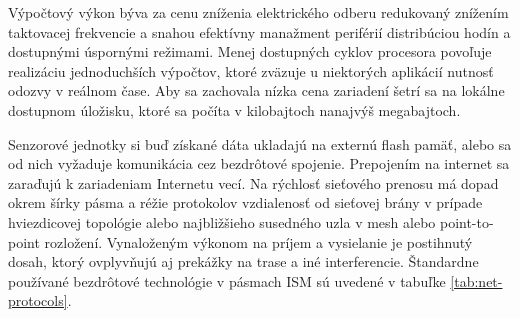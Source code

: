 Výpočtový výkon býva za cenu zníženia elektrického odberu redukovaný
znížením taktovacej frekvencie a snahou efektívny manažment periférií distribúciou hodín a dostupnými
úspornými režimami. Menej dostupných cyklov procesora povoľuje realizáciu jednoduchších výpočtov, ktoré zväzuje
u niektorých aplikácií nutnosť odozvy v reálnom čase. Aby sa zachovala nízka cena zariadení šetrí sa
na lokálne dostupnom úložisku, ktoré sa počíta v kilobajtoch nanajvýš megabajtoch.

Senzorové jednotky si buď získané dáta ukladajú na externú flash pamäť, alebo sa od nich vyžaduje komunikácia
cez bezdrôtové spojenie. Prepojením na internet sa zaraďujú k zariadeniam Internetu vecí.
Na rýchlosť sieťového prenosu má dopad okrem šírky pásma a réžie protokolov
vzdialenosť od sieťovej brány v prípade hviezdicovej topológie alebo najbližšieho susedného uzla v mesh
alebo point-to-point rozložení. Vynaloženým výkonom na príjem a vysielanie je postihnutý dosah, ktorý
ovplyvňujú aj prekážky na trase a iné interferencie. Štandardne používané bezdrôtové technológie
v pásmach ISM sú uvedené v tabuľke \ref{tab:net-protocols}.

